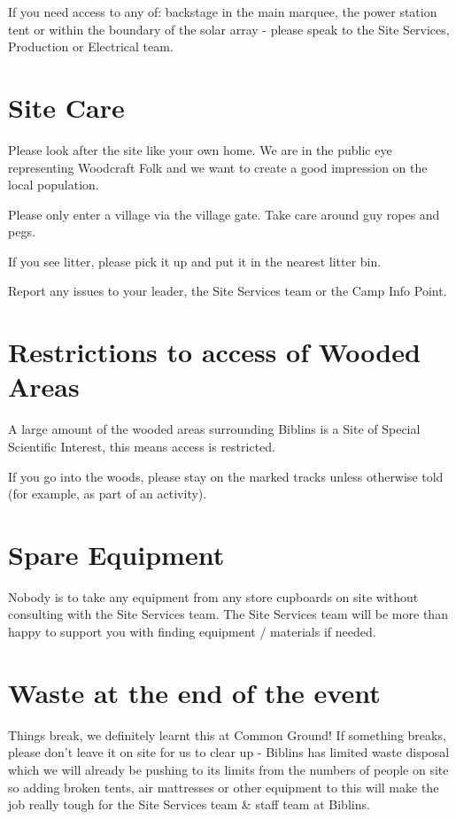\documentclass[a4paper, 11pt]{report}
\begin{document}
If you need access to any of: backstage in the main marquee, the power station tent or within the boundary of the solar array - please speak to the Site Services, Production or Electrical team.


\section{Site Care}
Please look after the site like your own home. We are in the public eye representing Woodcraft Folk and we want to create a good impression on the local population.\nl

Please only enter a village via the village gate. Take care around guy ropes and pegs. \nl

If you see litter, please pick it up and put it in the nearest litter bin.\nl

Report any issues to your leader, the Site Services team or the Camp Info Point.

\section{Restrictions to access of Wooded Areas}
A large amount of the wooded areas surrounding Biblins is a Site of Special Scientific Interest, this means access is restricted.\nl

If you go into the woods, please stay on the marked tracks unless otherwise told (for example, as part of an activity).

\section{Spare Equipment}
Nobody is to take any equipment from any store cupboards on site without consulting with the Site Services team. The Site Services team will be more than happy to support you with finding equipment / materials if needed.

\section{Waste at the end of the event}
Things break, we definitely learnt this at Common Ground! If something breaks, please don't leave it on site for us to clear up - Biblins has limited waste disposal which we will already be pushing to its limits from the numbers of people on site so adding broken tents, air mattresses or other equipment to this will make the job really tough for the Site Services team \& staff team at Biblins. 
\end{document}
